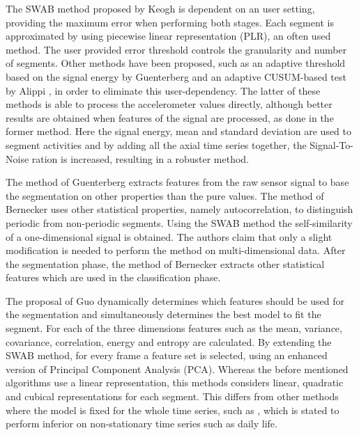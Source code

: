 The SWAB method proposed by Keogh \etal \cite{keogh2001online} is dependent on an user setting, providing the maximum error when performing both stages.
Each segment is approximated by using piecewise linear representation (PLR), an often used method.
The user provided error threshold controls the granularity and number of segments.
Other methods have been proposed, such as an adaptive threshold based on the signal energy by Guenterberg \etal \cite{guenterberg2009automatic} and an adaptive CUSUM-based test by Alippi \etal \cite{alippi2006adaptive}, in order to eliminate this user-dependency.
The latter of these methods is able to process the accelerometer values directly, although better results are obtained when features of the signal are processed, as done in the former method.
Here the signal energy, mean and standard deviation are used to segment activities and by adding all the axial time series together, the Signal-To-Noise ration is increased, resulting in a robuster method.

The method of Guenterberg \etal extracts features from the raw sensor signal to base the segmentation on other properties than the pure values.
The method of Bernecker \etal \cite{bernecker2012activity} uses other statistical properties, namely autocorrelation, to distinguish periodic from non-periodic segments.
Using the SWAB method the self-similarity of a one-dimensional signal is obtained.
The authors claim that only a slight modification is needed to perform the method on multi-dimensional data.
After the segmentation phase, the method of Bernecker \etal extracts other statistical features which are used in the classification phase.

The proposal of Guo \etal \cite{guo2012adaptive} dynamically determines which features should be used for the segmentation and simultaneously determines the best model to fit the segment.
For each of the three dimensions features such as the mean, variance, covariance, correlation, energy and entropy are calculated.
By extending the SWAB method, for every frame a feature set is selected, using an enhanced version of Principal Component Analysis (PCA).
Whereas the before mentioned algorithms use a linear representation, this methods considers linear, quadratic and cubical representations for each segment.
This differs from other methods where the model is fixed for the whole time series, such as \cite{fuchs2010online}, which is stated to perform inferior on non-stationary time series such as daily life.

